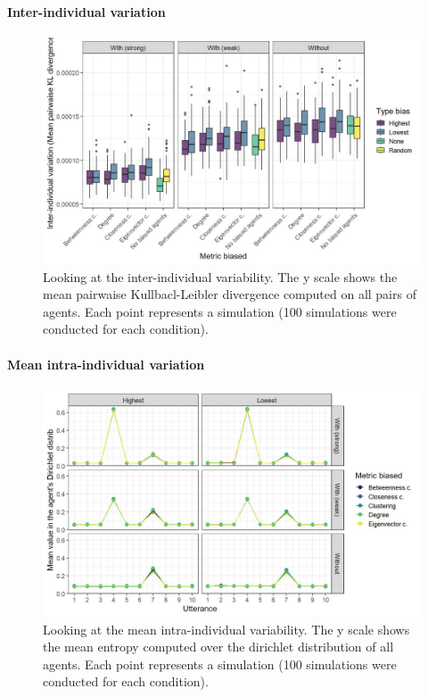 \documentclass[
]{article}
\begin{document}
\hypertarget{inter-individual-variation-2}{%
\paragraph{Inter-individual
variation}\label{inter-individual-variation-2}}

\begin{figure}[!H]

{\centering \includegraphics{./Figures/unnamed-chunk-206-1} 

}

\caption{Looking at the inter-individual variability. The y scale shows the mean pairwaise Kullbacl-Leibler divergence computed on all pairs of agents. Each point represents a simulation (100 simulations were conducted for each condition).}\label{fig:unnamed-chunk-206}
\end{figure}

\hypertarget{mean-intra-individual-variation-2}{%
\paragraph{Mean intra-individual
variation}\label{mean-intra-individual-variation-2}}

\begin{figure}[!H]

{\centering \includegraphics{./Figures/unnamed-chunk-207-1} 

}

\caption{Looking at the mean intra-individual variability. The y scale shows the mean entropy computed over the dirichlet distribution of all agents. Each point represents a simulation (100 simulations were conducted for each condition).}\label{fig:unnamed-chunk-207}
\end{figure}
\end{document}
